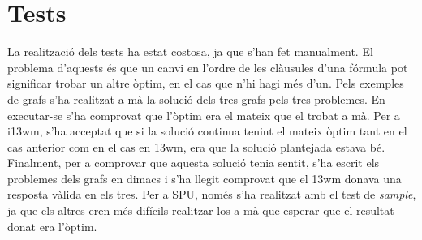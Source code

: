 \documentclass{article}
\begin{document}
\section{Tests}
La realització dels tests ha estat costosa, ja que s'han fet manualment. El  problema d'aquests és que un 
canvi en l'ordre de les clàusules d'una fórmula pot significar trobar un altre òptim, en el cas que n'hi hagi 
més d'un. Pels exemples de grafs s'ha realitzat a mà la solució dels tres grafs pels tres problemes. En executar-se
s'ha comprovat que l'òptim era el mateix que el trobat a mà.
Per a i13wm, s'ha acceptat que si la solució continua tenint el mateix òptim tant en el cas anterior com en el cas en 13wm, 
era que la solució plantejada estava bé. Finalment, per a comprovar que aquesta solució tenia sentit, s'ha escrit els problemes dels
grafs en dimacs i s'ha llegit comprovat que el 13wm donava una resposta vàlida en els tres. 
Per a SPU, només s'ha realitzat amb el test de \textit{sample}, ja que els altres eren més difícils realitzar-los a mà que esperar
que el resultat donat era l'òptim.
\end{document}

